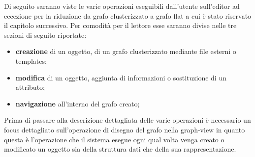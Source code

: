 \large{
Di seguito saranno viste le varie operazioni eseguibili dall'utente sull'editor ad eccezione per la riduzione da grafo clusterizzato a grafo flat a cui è stato riservato il capitolo successivo. Per comodità per il lettore esse saranno divise nelle tre sezioni di seguito riportate:
\begin{itemize}
	\item \textbf{creazione} di un oggetto, di un grafo clusterizzato mediante file esterni o templates;
	\item \textbf{modifica} di un oggetto, aggiunta di informazioni o sostituzione di un attributo;
	\item \textbf{navigazione} all'interno del grafo creato; 
\end{itemize}
Prima di passare alla descrizione dettagliata delle varie operazioni è necessario un focus dettagliato sull'operazione di disegno del grafo nella graph-view in quanto questa è l'operazione che il sistema esegue ogni qual volta venga creato o modificato un oggetto sia della struttura dati che della sua rappresentazione.
}

